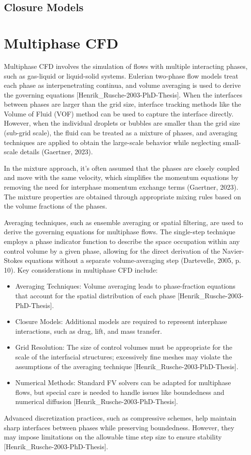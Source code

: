 \subsection{Closure Models}
\section{Multiphase CFD}
Multiphase CFD involves the simulation of flows with multiple interacting phases, such as gas-liquid or liquid-solid systems. 
Eulerian two-phase flow models treat each phase as interpenetrating continua, and volume averaging is used to derive the governing 
equations [Henrik\_Rusche-2003-PhD-Thesis].
When the interfaces between phases are larger than the grid size, interface tracking 
methods like the Volume of Fluid (VOF) method can be used to capture the interface directly. 
However, when the individual droplets or bubbles are smaller than the grid size (sub-grid 
scale), the fluid can be treated as a mixture of phases, and averaging techniques are 
applied to obtain the large-scale behavior while neglecting small-scale details (Gaertner, 2023).

In the mixture approach, it's often assumed that the phases are closely coupled and 
move with the same velocity, which simplifies the momentum equations by removing the need for interphase momentum exchange terms (Gaertner, 2023). The mixture properties are obtained through appropriate mixing rules based on the volume fractions of the phases.

Averaging techniques, such as ensemble averaging or spatial filtering, are used to derive 
the governing equations for multiphase flows. The single-step technique employs a phase 
indicator function to describe the space occupation within any control volume by a given 
phase, allowing for the direct derivation of the Navier-Stokes equations without a separate 
volume-averaging step (Dartevelle, 2005, p. 10).
Key considerations in multiphase CFD include:
\begin{itemize}
    \item Averaging Techniques: Volume averaging leads to phase-fraction equations that account for the spatial distribution of each phase
     [Henrik\_Rusche-2003-PhD-Thesis].
    \item Closure Models: Additional models are required to represent interphase interactions, such as drag, lift, and mass transfer.
    \item Grid Resolution: The size of control volumes must be appropriate for the scale of the interfacial structures; excessively fine 
    meshes may violate the assumptions of the averaging technique [Henrik\_Rusche-2003-PhD-Thesis].
    \item Numerical Methods: Standard FV solvers can be adapted for multiphase flows, but special care is needed to handle issues like 
    boundedness and numerical diffusion [Henrik\_Rusche-2003-PhD-Thesis].
\end{itemize}
Advanced discretization practices, such as compressive schemes, help maintain sharp interfaces between phases while preserving boundedness. 
However, they may impose limitations on the allowable time step size to ensure stability [Henrik\_Rusche-2003-PhD-Thesis].
